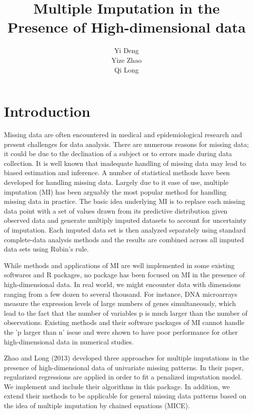 \documentclass[a4paper]{article}
\title{Multiple Imputation in the Presence of High-dimensional data}
\author{Yi Deng\\
Yize Zhao\\
Qi Long}
\begin{document}



\maketitle
\section{Introduction}
Missing data are often encountered in medical and epidemiological research and present challenges for data analysis. There are numerous reasons for missing data; it could be due to the declination of a subject or to errors made during data collection. It is well known that inadequate handling of missing data may lead to biased estimation and inference.
A number of statistical methods have been developed for handling missing data. Largely due to it ease of use, multiple imputation (MI) has been arguably the most popular method for handling missing data in practice.  The basic idea underlying MI is to replace each missing data point with  a set of values drawn from its predictive distribution given observed data and generate multiply imputed datasets to account for uncertainty of imputation. Each imputed data set is then analyzed separately using standard complete-data analysis methods and the results are combined across all imputed data sets using Rubin's rule. 

While methods and applications of MI are well implemented in some existing softwares and R packages, no package has been focused on MI in the presence of high-dimensional data.  In real world, we might encounter data with dimensions ranging from a few dozen to several thousand. For instance, DNA microarrays measure the expression levels of large numbers of genes simultaneously, which lead to the fact that the number of variables p is much larger than the number of observations. Existing methods and their software packages of MI cannot handle the 'p larger than n' issue and were shown to have poor performance for other high-dimensional data in numerical studies. 

Zhao and Long (2013) developed three approaches for multiple imputations in the presence of high-dimensional data of univariate missing patterns. In their paper, regularized regressions are applied in order to fit a penalized imputation model. We implement and include their algorithms in this package. In addition, we extend their methods to be applicable for general missing data patterns based on the idea of multiple imputation by chained equations (MICE). 
\end{document}
